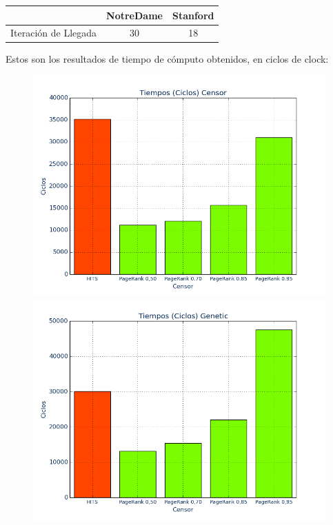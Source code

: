 \documentclass[a4paper]{article}
\begin{document}
\begin{center}

\begin{tabular}{r|c|c}
&  \textbf{NotreDame} & \textbf{Stanford}\\ 
\hline
 Iteración de Llegada & 30 & 18\\
\end{tabular}

\end{center}

Estos son los resultados de tiempo de cómputo obtenidos, en ciclos de clock:

\begin{figure}[htbp]
\centering
\includegraphics[scale=0.25]{img/Tiempos-Censor.png}
\includegraphics[scale=0.25]{img/Tiempos-Genetic.png}

\end{figure}
\end{document}
